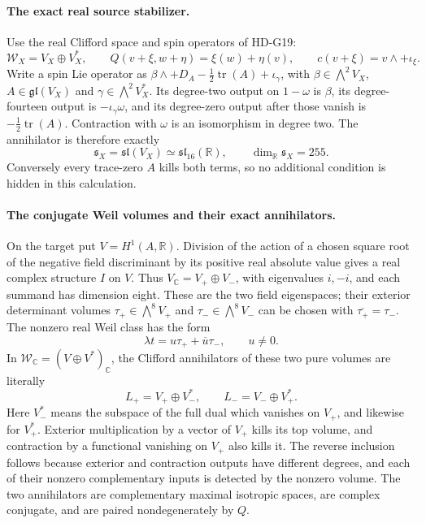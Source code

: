 \paragraph{The exact real source stabilizer.}
Use the real Clifford space and spin operators of HD-G19:
\[
 \mathcal W_X=V_X\oplus V_X^*,\qquad
 Q(v+\xi,w+\eta)=\xi(w)+\eta(v),
 \qquad c(v+\xi)=v\wedge+\iota_\xi.
\]
Write a spin Lie operator as
\(\beta\wedge+D_A-\tfrac12\operatorname{tr}(A)+\iota_\gamma\),
with \(\beta\in\bigwedge^2V_X\), \(A\in\mathfrak{gl}(V_X)\)
and \(\gamma\in\bigwedge^2V_X^*\). Its degree-two output on
\(1-\omega\) is \(\beta\), its degree-fourteen output is
\(-\iota_\gamma\omega\), and its degree-zero output after those
vanish is \(-\tfrac12\operatorname{tr}(A)\). Contraction with
\(\omega\) is an isomorphism in degree two. The annihilator is
therefore exactly
\begin{equation}\label{eq:G20-source-stabilizer}
 \mathfrak s_X=\mathfrak{sl}(V_X)
                    \simeq\mathfrak{sl}_{16}(\mathbb R),
 \qquad \dim_{\mathbb R}\mathfrak s_X=255.
\end{equation}
Conversely every trace-zero \(A\) kills both terms, so no additional
condition is hidden in this calculation.

\paragraph{The conjugate Weil volumes and their exact annihilators.}
On the target put \(V=H^1(A,\mathbb R)\). Division of the action
of a chosen square root of the negative field discriminant by its
positive real absolute value gives a real complex structure \(I\)
on \(V\). Thus \(V_{\mathbb C}=V_+\oplus V_-\), with eigenvalues
\(i,-i\), and each summand has dimension eight. These are the two
field eigenspaces; their exterior determinant volumes
\(\tau_+\in\bigwedge^8V_+\) and
\(\tau_-\in\bigwedge^8V_-\) can be chosen with
\(\overline{\tau_+}=\tau_-\). The nonzero real Weil class has
the form
\[
                 \lambda t=u\tau_++\overline u\tau_-,
                 \qquad u\ne0.
\]
In \(\mathcal W_{\mathbb C}=(V\oplus V^*)_{\mathbb C}\), the
Clifford annihilators of these two pure volumes are literally
\begin{equation}\label{eq:G20-annihilators}
 L_+=V_+\oplus V_-^*,\qquad
 L_-=V_-\oplus V_+^*.
\end{equation}
Here \(V_-^*\) means the subspace of the full dual which vanishes
on \(V_+\), and likewise for \(V_+^*\). Exterior multiplication
by a vector of \(V_+\) kills its top volume, and contraction by a
functional vanishing on \(V_+\) also kills it. The reverse inclusion
follows because exterior and contraction outputs have different
degrees, and each of their nonzero complementary inputs is detected
by the nonzero volume. The two annihilators are complementary
maximal isotropic spaces, are complex conjugate, and are paired
nondegenerately by \(Q\).

